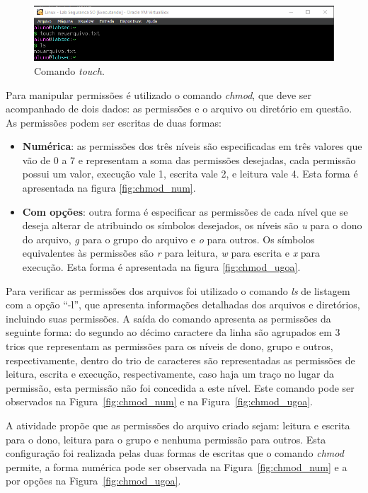 \documentclass[
  12pt,				%
  oneside,   	        %
  a4paper,			%
  english,			%
  french,				%
  spanish,			%
  brazil,				%
  ]{pacotes/abntex2}
\begin{document}
\begin{figure}[H]
  \centering
  \includegraphics[scale=0.7]{figuras/touch.png}
  \caption{Comando \textit{touch}.}
  \label{fig:touch}
\end{figure}

Para manipular permissões é utilizado o comando \textit{chmod}, que deve ser acompanhado de dois dados: as permissões e o arquivo ou diretório em questão. As permissões podem ser escritas de duas formas:

\begin{itemize}
    \item \textbf{Numérica}: as permissões dos três níveis são especificadas em três valores que vão de 0 a 7 e representam a soma das permissões desejadas, cada permissão possui um valor, execução vale 1, escrita vale 2, e leitura vale 4. Esta forma é apresentada na figura \ref{fig:chmod_num}.
    \item \textbf{Com opções}: outra forma é especificar as permissões de cada nível que se deseja alterar de atribuindo os símbolos desejados, os níveis são \textit{u} para o dono do arquivo, \textit{g} para o grupo do arquivo e \textit{o} para outros. Os símbolos equivalentes às permissões são \textit{r} para leitura, \textit{w} para escrita e \textit{x} para execução. Esta forma é apresentada na figura \ref{fig:chmod_ugoa}.
\end{itemize}

Para verificar as permissões dos arquivos foi utilizado o comando \textit{ls} de listagem com a opção ``-l'', que apresenta informações detalhadas dos arquivos e diretórios, incluindo suas permissões. A saída do comando apresenta as permissões da seguinte forma: do segundo ao décimo caractere da linha são agrupados em 3 trios que representam as permissões para os níveis de dono, grupo e outros, respectivamente, dentro do trio de caracteres são representadas as permissões de leitura, escrita e execução, respectivamente, caso haja um traço no lugar da permissão, esta permissão não foi concedida a este nível. Este comando pode ser observados na Figura~\ref{fig:chmod_num} e na Figura~\ref{fig:chmod_ugoa}.

A atividade propõe que as permissões do arquivo criado sejam: leitura e escrita para o dono, leitura para o grupo e nenhuma permissão para outros. Esta configuração foi realizada pelas duas formas de escritas que o comando \textit{chmod} permite, a forma numérica pode ser observada na Figura~\ref{fig:chmod_num} e a por opções na Figura~\ref{fig:chmod_ugoa}.
\end{document}
